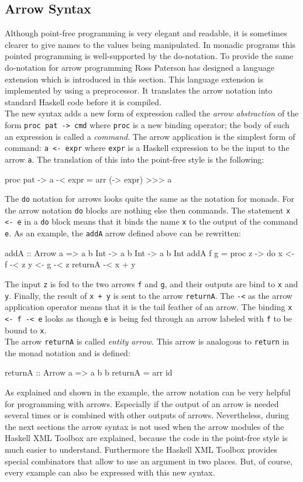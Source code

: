 \documentclass[11pt,a4paper,headsepline, bibtotoc]{scrreprt}
\begin{document}
\subsection{Arrow Syntax}\label{syntax}
Although point-free programming is very elegant and readable, it is sometimes clearer to give names to the values being manipulated. In monadic programs this pointed programming is well-supported by the do-notation. To provide the same do-notation for arrow programming Ross Paterson has designed a language extension \cite{Pat:2001} which is introduced in this section. This language extension is implemented by using a preprocessor. It translates the arrow notation into standard Haskell code before it is compiled.\\
The new syntax adds a new form of expression called the {\it arrow abstraction} of the form {\tt proc pat -> cmd} where {\tt proc} is a new binding operator; the body of such an expression is called a {\it command}. The arrow application is the simplest form of command: {\tt a <- expr} where {\tt expr} is a Haskell expression to be the input to the arrow {\tt a}. The translation of this into the point-free style is the following:
\begin{code}
proc pat -> a -< expr  =  arr (\pat -> expr) >>> a
\end{code}
The {\tt do} notation for arrows looks quite the same as the notation for monads. For the arrow notation {\tt do} blocks are nothing else then commands. The statement {\tt x <- e} in a {\tt do} block means that it binds the name {\tt x} to the output of the command {\tt e}. As an example, the {\tt addA} arrow defined above can be rewritten:
\clearpage
\begin{code}
addA :: Arrow a => a b Int -> a b Int -> a b Int
addA f g = proc z -> do
    x <- f -< z
    y <- g -< z
    returnA -< x + y
\end{code}
The input {\tt z} is fed to the two arrows {\tt f} and {\tt g}, and their outputs are bind to {\tt x} and {\tt y}. Finally, the result of {\tt x + y} is sent to the arrow {\tt returnA}. The {\tt -<} as the arrow application operator means that it is the tail feather of an arrow. The binding {\tt x <- f -< e} looks as though {\tt e} is being fed through an arrow labeled with {\tt f} to be bound to {\tt x}.\\
The arrow {\tt returnA} is called {\it entity arrow}. This arrow is analogous to {\tt return} in the monad notation and is defined:
\begin{code}
returnA :: Arrow a => a b b
returnA = arr id 
\end{code}
As explained and shown in the example, the arrow notation can be very helpful for programming with arrows. Especially if the output of an arrow is needed several times or is combined with other outputs of arrows. Nevertheless, during the next sections the arrow syntax is not used when the arrow modules of the Haskell XML Toolbox are explained, because the code in the point-free style is much easier to understand. Furthermore the Haskell XML Toolbox provides special combinators that allow to use an argument in two places. But, of course, every example can also be expressed with this new syntax.  
\end{document}
